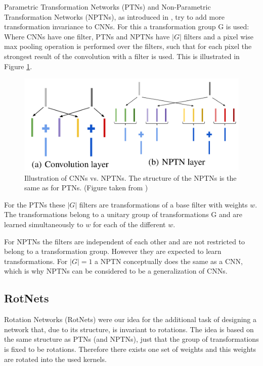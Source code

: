 \documentclass{llncs}
\begin{document}
Parametric Transformation Networks (PTNs) and Non-Parametric Transformation Networks (NPTNs), as introduced in \cite{NPTN18}, try to add more transformation invariance to CNNs. For this a transformation group G is used:
Where CNNs have one filter, PTNs and NPTNs have $|G|$ filters and a pixel wise max pooling operation is performed over the filters, such that for each pixel the strongest result of the convolution with a filter is used. This is illustrated in Figure \ref{pic:nptn}.


\begin{figure}
	\begin{center}
	\includegraphics[scale=0.15]{result_images/nptn_paper.png}
	\caption{Illustration of CNNs vs. NPTNs. The structure of the NPTNs is the same as for PTNs. (Figure taken from \cite{NPTN18})}
	\label{pic:nptn}
	\end{center}
\end{figure}
For the PTNs these $|G|$ filters are transformations of a base filter with weights $w$. The transformations belong to a unitary group of transformations G and are learned simultaneously to $w$ for each of the different $w$. 


For NPTNs the filters are independent of each other and are not restricted to belong to a transformation group. However they are expected to learn transformations.
For $|G|=1$ a NPTN conceptually does the same as a CNN, which is why NPTNs can be considered to be a generalization of CNNs. 



\subsection{RotNets}
Rotation Networks (RotNets) were our idea for the additional task of designing a network that, due to its structure, is invariant to rotations. 
The idea is based on the same structure as PTNs (and NPTNs), just that the group of transformations is fixed to be rotations. Therefore there exists one set of weights and this weights are rotated into the used kernels. 
\newcommand{\pytorch}{PyTorch }
\end{document}
